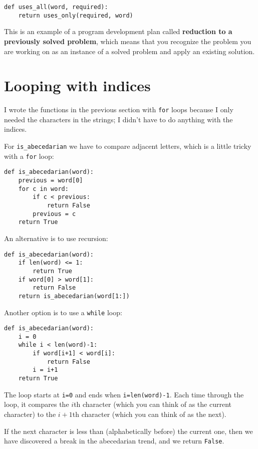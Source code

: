 \documentclass[10pt]{book}
\begin{document}
\begin{verbatim}
def uses_all(word, required):
    return uses_only(required, word)
\end{verbatim}
%
This is an example of a program development plan called {\bf
  reduction to a previously solved problem}, which means that you
recognize the problem you are working on as an instance of a solved
problem and apply an existing solution.   


\section{Looping with indices}

I wrote the functions in the previous section with {\tt for}
loops because I only needed the characters in the strings; I didn't
have to do anything with the indices.

For \verb"is_abecedarian" we have to compare adjacent letters,
which is a little tricky with a {\tt for} loop:

\begin{verbatim}
def is_abecedarian(word):
    previous = word[0]
    for c in word:
        if c < previous:
            return False
        previous = c
    return True
\end{verbatim}

An alternative is to use recursion:

\begin{verbatim}
def is_abecedarian(word):
    if len(word) <= 1:
        return True
    if word[0] > word[1]:
        return False
    return is_abecedarian(word[1:])
\end{verbatim}

Another option is to use a {\tt while} loop:

\begin{verbatim}
def is_abecedarian(word):
    i = 0
    while i < len(word)-1:
        if word[i+1] < word[i]:
            return False
        i = i+1
    return True
\end{verbatim}
%
The loop starts at {\tt i=0} and ends when {\tt i=len(word)-1}.  Each
time through the loop, it compares the $i$th character (which you can
think of as the current character) to the $i+1$th character (which you
can think of as the next).

If the next character is less than (alphabetically before) the current
one, then we have discovered a break in the abecedarian trend, and
we return {\tt False}.
\end{document}
